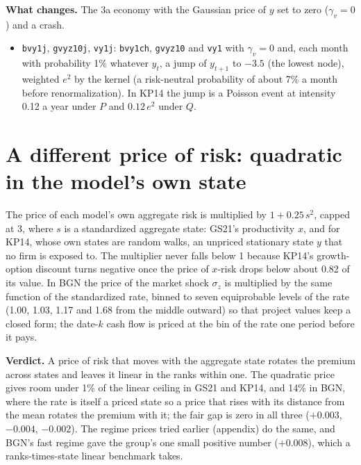 \documentclass[11pt]{article}
\begin{document}
\noindent\textbf{What changes.} The 3a economy with the Gaussian price of $y$ set to zero ($\gamma_v=0$) and a crash.
\begin{itemize}
  \item \texttt{bvy1j}, \texttt{gvyz10j}, \texttt{vy1j}: \texttt{bvy1ch}, \texttt{gvyz10} and \texttt{vy1} with $\gamma_v=0$ and, each month with probability 1\% whatever $y_t$, a jump of $y_{t+1}$ to $-3.5$ (the lowest node), weighted $e^{2}$ by the kernel (a risk-neutral probability of about 7\% a month before renormalization). In KP14 the jump is a Poisson event at intensity 0.12 a year under $P$ and $0.12\,e^{2}$ under $Q$.
\end{itemize}


\section{A different price of risk: quadratic in the model's own state}

The price of each model's own aggregate risk is multiplied by $1 + 0.25\,s^2$, capped at 3, where $s$ is a standardized aggregate state: GS21's productivity $x$, and for KP14, whose own states are random walks, an unpriced stationary state $y$ that no firm is exposed to. The multiplier never falls below 1 because KP14's growth-option discount turns negative once the price of $x$-risk drops below about 0.82 of its value. In BGN the price of the market shock $\sigma_z$ is multiplied by the same function of the standardized rate, binned to seven equiprobable levels of the rate (1.00, 1.03, 1.17 and 1.68 from the middle outward) so that project values keep a closed form; the date-$k$ cash flow is priced at the bin of the rate one period before it pays.


\noindent\textbf{Verdict.} A price of risk that moves with the aggregate state rotates the premium across states and leaves it linear in the ranks within one. The quadratic price gives room under 1\% of the linear ceiling in GS21 and KP14, and 14\% in BGN, where the rate is itself a priced state so a price that rises with its distance from the mean rotates the premium with it; the fair gap is zero in all three ($+0.003$, $-0.004$, $-0.002$). The regime prices tried earlier (appendix) do the same, and BGN's fast regime gave the group's one small positive number ($+0.008$), which a ranks-times-state linear benchmark takes.
\end{document}
